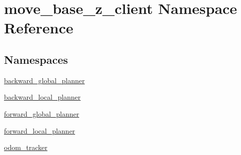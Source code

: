 \hypertarget{namespacemove__base__z__client}{}\section{move\+\_\+base\+\_\+z\+\_\+client Namespace Reference}
\label{namespacemove__base__z__client}
\subsection*{Namespaces}
\begin{DoxyCompactItemize}
\item 
 \hyperlink{namespacemove__base__z__client_1_1backward__global__planner}{backward\+\_\+global\+\_\+planner}
\item 
 \hyperlink{namespacemove__base__z__client_1_1backward__local__planner}{backward\+\_\+local\+\_\+planner}
\item 
 \hyperlink{namespacemove__base__z__client_1_1forward__global__planner}{forward\+\_\+global\+\_\+planner}
\item 
 \hyperlink{namespacemove__base__z__client_1_1forward__local__planner}{forward\+\_\+local\+\_\+planner}
\item 
 \hyperlink{namespacemove__base__z__client_1_1odom__tracker}{odom\+\_\+tracker}
\end{DoxyCompactItemize}
